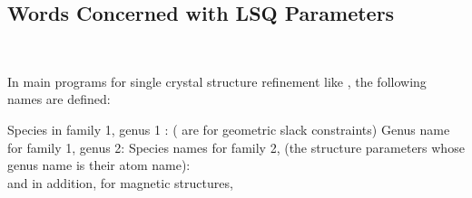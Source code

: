\subsection{Words Concerned with LSQ Parameters}
\hypertarget{ss:fix}{}
\ssk
{}\\
\p
\begin{varindent}{1cm}
In main programs for single crystal structure refinement like , 
the following names are defined:\\
\end{varindent}
\begin{varindent}{1.5 cm}
Species in family 1, genus 1    : 
 ( are for geometric slack constraints)\p
Genus name for family 1, genus 2: \p
Species names for family 2, (the structure parameters whose
                                       genus name is their atom name):\p
{}\\ and in addition, for magnetic
structures,\\ 
\end{varindent}
\p
